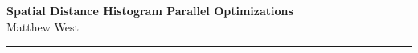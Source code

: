 \documentclass[a4paper,12pt]{article}
\begin{document}
	\pagestyle{fancy}
	\thispagestyle{empty}
	\fancyhead[R]{}
	\fancyhead[L]{}
	\renewcommand*{\thefootnote}{\fnsymbol{footnote}}
	\begin{center}
		\Large{\textbf{Spatial Distance Histogram Parallel Optimizations}}
		\vspace{0.4cm}
		\normalsize
		\\ Matthew West
		\vspace{0.1cm}
		\medskip
		\normalsize
	\end{center}
	{\color{gray}\hrule}
	\vspace{0.4cm}
	\medskip
	\begin{multicols}{2}
	\end{multicols}
	
	\begin{multicols}{2}
	\end{multicols}
\end{document}
